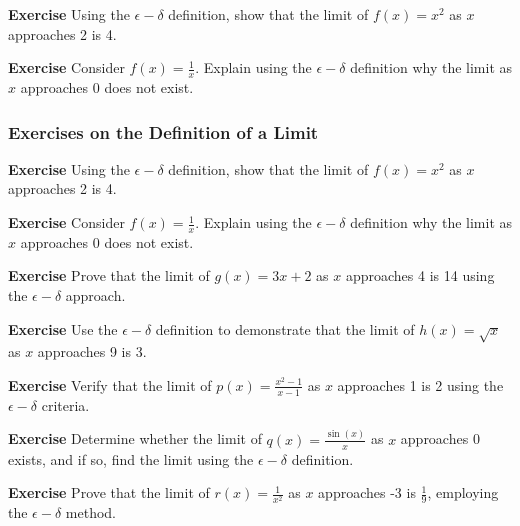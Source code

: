 \documentclass[a4paper,12pt]{book}
\newenvironment{exercise}[1][]
  {\par\medskip\noindent\textbf{Exercise #1} \rmfamily}
  {\medskip}
\begin{document}
\begin{exercise}
Using the \(\epsilon-\delta\) definition, show that the limit of \( f(x) = x^2 \) as \( x \) approaches 2 is 4.
\end{exercise}

\begin{exercise}
Consider \( f(x) = \frac{1}{x} \). Explain using the \(\epsilon-\delta\) definition why the limit as \( x \) approaches 0 does not exist.
\end{exercise}

\subsubsection*{Exercises on the Definition of a Limit}

\begin{exercise}
Using the \(\epsilon-\delta\) definition, show that the limit of \( f(x) = x^2 \) as \( x \) approaches 2 is 4.
\end{exercise}

\begin{exercise}
Consider \( f(x) = \frac{1}{x} \). Explain using the \(\epsilon-\delta\) definition why the limit as \( x \) approaches 0 does not exist.
\end{exercise}

\begin{exercise}
Prove that the limit of \( g(x) = 3x + 2 \) as \( x \) approaches 4 is 14 using the \(\epsilon-\delta\) approach.
\end{exercise}

\begin{exercise}
Use the \(\epsilon-\delta\) definition to demonstrate that the limit of \( h(x) = \sqrt{x} \) as \( x \) approaches 9 is 3.
\end{exercise}

\begin{exercise}
Verify that the limit of \( p(x) = \frac{x^2 - 1}{x - 1} \) as \( x \) approaches 1 is 2 using the \(\epsilon-\delta\) criteria.
\end{exercise}

\begin{exercise}
Determine whether the limit of \( q(x) = \frac{\sin(x)}{x} \) as \( x \) approaches 0 exists, and if so, find the limit using the \(\epsilon-\delta\) definition.
\end{exercise}

\begin{exercise}
Prove that the limit of \( r(x) = \frac{1}{x^2} \) as \( x \) approaches -3 is \(\frac{1}{9}\), employing the \(\epsilon-\delta\) method.
\end{exercise}
\end{document}
